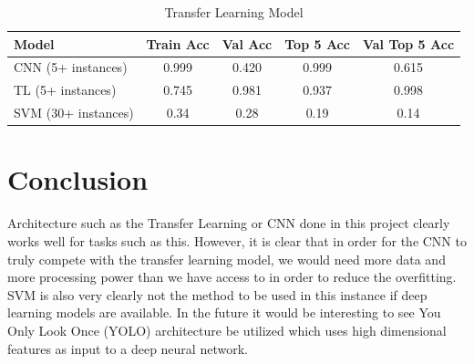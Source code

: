 \documentclass[paper=a4, fontsize=11pt]{scrartcl}
\numberwithin{equation}{section}		%
\numberwithin{table}{section}				%
\begin{document}
\begin{table}[!h]
  \begin{center}
    \caption{Transfer Learning Model}
    \label{tab:results}
    \begin{tabular}{l|c|c|c|c}
      \textbf{Model} & \textbf{Train Acc} & \textbf{Val Acc} & \textbf{Top 5 Acc} & \textbf{Val Top 5 Acc} \\
      \hline
      CNN (5+ instances) & 0.999 & 0.420 & 0.999 & 0.615\\
      TL (5+ instances) & 0.745 & 0.981 & 0.937 & 0.998\\
      SVM (30+ instances) & 0.34 & 0.28 & 0.19&0.14\\
    \end{tabular}
  \end{center}
\end{table}

\section{Conclusion}\label{sec: conclusion}
Architecture such as the Transfer Learning or CNN done in this project clearly works well for tasks such as this. However, it is clear that in order for the CNN to truly compete with the transfer learning model, we would need more data and more processing power than we have access to in order to reduce the overfitting. SVM is also very clearly not the method to be used in this instance if deep learning models are available. In the future it would be interesting to see You Only Look Once (YOLO) architecture be utilized which uses high dimensional features as input to a deep neural network.

 
\needspace{20em}%
\newpage
\end{document}

